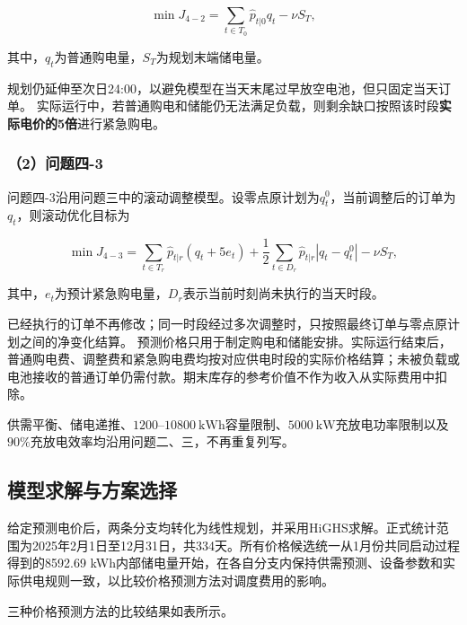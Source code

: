 \begin{equation}
\min J_{4-2}
=
\sum_{t\in T_0}
\hat{p}_{t|0}q_t
-
\nu S_T,
\end{equation}

其中，$q_t$为普通购电量，$S_T$为规划末端储电量。

规划仍延伸至次日24:00，以避免模型在当天末尾过早放空电池，但只固定当天订单。
实际运行中，若普通购电和储能仍无法满足负载，则剩余缺口按照该时段\textbf{实际电价的5倍}进行紧急购电。

\subsubsection*{（2）问题四-3}

问题四-3沿用问题三中的滚动调整模型。设零点原计划为$q_t^0$，当前调整后的订单为$q_t$，则滚动优化目标为

\begin{equation}
\min J_{4-3}
=
\sum_{t\in T_r}
\hat{p}_{t|r}
\left(q_t+5e_t\right)
+
\frac{1}{2}
\sum_{t\in D_r}
\hat{p}_{t|r}
\left|q_t-q_t^0\right|
-
\nu S_T,
\end{equation}

其中，$e_t$为预计紧急购电量，$D_r$表示当前时刻尚未执行的当天时段。

已经执行的订单不再修改；同一时段经过多次调整时，只按照最终订单与零点原计划之间的净变化结算。
预测价格只用于制定购电和储能安排。实际运行结束后，普通购电费、调整费和紧急购电费均按对应供电时段的实际价格结算；未被负载或电池接收的普通订单仍需付款。期末库存的参考价值不作为收入从实际费用中扣除。

供需平衡、储电递推、$1200$--$10800\ \mathrm{kWh}$容量限制、$5000\ \mathrm{kW}$充放电功率限制以及$90\%$充放电效率均沿用问题二、三，不再重复列写。


\subsection{模型求解与方案选择}

给定预测电价后，两条分支均转化为线性规划，并采用HiGHS求解。正式统计范围为2025年2月1日至12月31日，共334天。所有价格候选统一从1月份共同启动过程得到的8592.69 kWh内部储电量开始，在各自分支内保持供需预测、设备参数和实际供电规则一致，以比较价格预测方法对调度费用的影响。

三种价格预测方法的比较结果如表所示。


